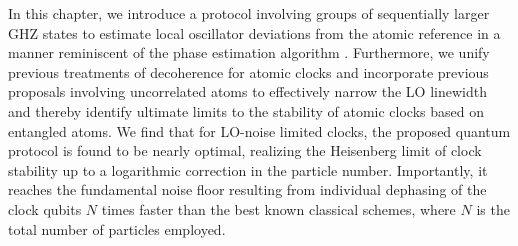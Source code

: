 In this chapter, we  introduce a protocol involving groups of sequentially
larger GHZ states to estimate local oscillator deviations from the atomic reference in
a manner reminiscent of the phase estimation algorithm \cite{Nielsen_Chuang}.
Furthermore, we unify previous treatments of decoherence for atomic clocks 
and incorporate previous proposals involving uncorrelated atoms to
effectively narrow the LO linewidth \cite{Rosenband2013, Borregaard2013} and thereby identify
 ultimate limits to the stability of atomic clocks based on entangled atoms. We find that for LO-noise limited clocks, the
proposed quantum protocol is found to be nearly optimal, realizing the
Heisenberg limit of clock stability up to a logarithmic correction in the
particle number.
Importantly, it reaches the fundamental noise floor  resulting from
individual dephasing of the clock qubits $N$ times faster than the best known
classical schemes, where $N$ is the total number of particles employed.


